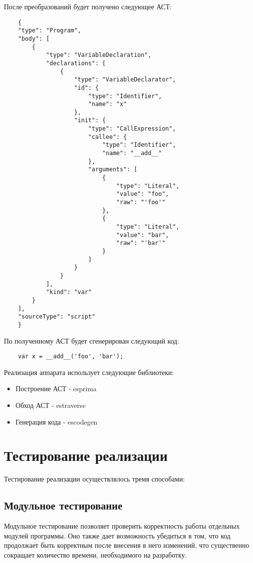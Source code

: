 После преобразований будет получено следующее АСТ:

\bigskip
\begin{lstlisting}
	{
    "type": "Program",
    "body": [
        {
            "type": "VariableDeclaration",
            "declarations": [
                {
                    "type": "VariableDeclarator",
                    "id": {
                        "type": "Identifier",
                        "name": "x"
                    },
                    "init": {
                        "type": "CallExpression",
                        "callee": {
                            "type": "Identifier",
                            "name": "__add__"
                        },
                        "arguments": [
                            {
                                "type": "Literal",
                                "value": "foo",
                                "raw": "'foo'"
                            },
                            {
                                "type": "Literal",
                                "value": "bar",
                                "raw": "'bar'"
                            }
                        ]
                    }
                }
            ],
            "kind": "var"
        }
    ],
    "sourceType": "script"
	}
\end{lstlisting}


По полученному АСТ будет сгенерирован следующий код:

\bigskip
\begin{lstlisting}
	var x = __add__('foo', 'bar');
\end{lstlisting}


Реализация аппарата использует следующие библиотеки:

\begin{itemize}
	\item Построение АСТ - esprima
	\item Обход АСТ - estraverse
	\item Генерация кода -  escodegen
\end{itemize}


\section{Тестирование реализации}
Тестирование реализации осуществлялось тремя способами:

\subsection{Модульное тестирование} 
	Модульное тестирование позволяет проверить корректность работы отдельных модулей программы. Оно также дает возможность убедиться в том, что код продолжает быть корректным после внесения в него изменений, что существенно сокращает количество времени, необходимого на разработку.


